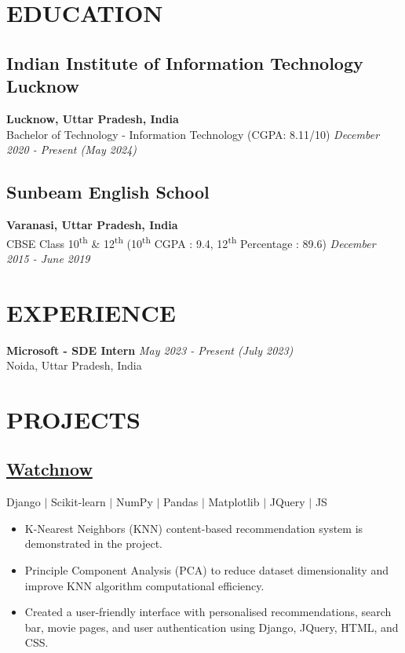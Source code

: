 \documentclass[12pt]{article}
\begin{document}
\vspace{-\topsep}
\vspace*{-5pt}
\section*{EDUCATION}
\subsection*{Indian Institute of Information Technology Lucknow}	\hfill\textbf{Lucknow, Uttar Pradesh, India} \\
Bachelor of Technology - Information Technology (CGPA: 8.11/10) 	\hfill\textit{December 2020 - Present (May 2024)} \\
\subsection*{Sunbeam English School}	\hfill\textbf{Varanasi, Uttar Pradesh, India} \\
CBSE Class 10\textsuperscript{th} \& 12\textsuperscript{th} (10\textsuperscript{th} CGPA : 9.4, 12\textsuperscript{th} Percentage : 89.6) \hfill \textit{December 2015 - June 2019} \\

\section*{EXPERIENCE}
\textbf{Microsoft - SDE Intern} \hfill \textit{May 2023 - Present (July 2023)} \\ 
Noida, Uttar Pradesh, India  \\

\section*{PROJECTS}
\subsection*{\href{https://github.com/prabhavagrawal7/watchnow/}{Watchnow}} \quad Django $|$ Scikit-learn $|$ NumPy $|$ Pandas $|$ Matplotlib $|$ JQuery $|$ JS \\
\begin{itemize}[topsep=0pt,itemsep=1pt,partopsep=3.5pt, parsep=1pt]
	\item K-Nearest Neighbors (KNN) content-based recommendation system is demonstrated in the project.
	\item Principle Component Analysis (PCA) to reduce dataset dimensionality and improve KNN algorithm computational efficiency.
	\item Created a user-friendly interface with personalised recommendations, search bar, movie pages, and user authentication using Django, JQuery, HTML, and CSS.
\end{itemize}
\end{document}

